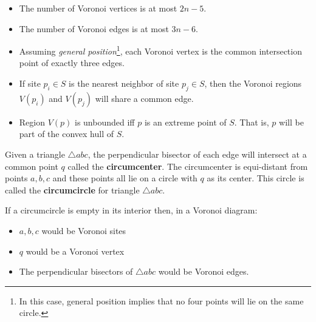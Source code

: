 \documentclass[12pt]{article}
\begin{document}
    \begin{itemize}
        \item The number of Voronoi vertices is at most $2n - 5$.

        \item The number of Voronoi edges is at most $3n - 6$.

        \item Assuming {\em general position}\footnote{In this case, general
        position implies that no four points will lie on the same circle.},
        each Voronoi vertex is the common intersection point of exactly three
        edges.

        \item If site $p_i \in S$ is the nearest neighbor of site $p_j \in S$,
        then the Voronoi regions $V(p_i)$ and $V(p_j)$ will share a common
        edge.

        \item Region $V(p)$ is unbounded iff $p$ is an extreme point of $S$.
        That is, $p$ will be part of the convex hull of $S$.
    \end{itemize}

    Given a triangle $\triangle abc$, the perpendicular bisector of each
    edge will intersect at a common point $q$ called the {\bf
    circumcenter}.  The circumcenter is equi-distant from points $a,b,c$
    and these points all lie on a circle with $q$ as its center.  This
    circle is called the {\bf circumcircle} for triangle $\triangle abc$.

        \begin{center}
        \end{center}

    If a circumcircle is empty in its interior then, in a Voronoi diagram:
        \begin{itemize}
            \item $a,b,c$ would be Voronoi sites
            \item $q$ would be a Voronoi vertex
            \item The perpendicular bisectors of $\triangle abc$ would be Voronoi edges.
        \end{itemize}
\end{document}
